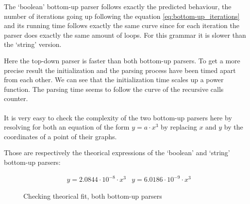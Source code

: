 The `boolean' bottom-up parser follows exactly the predicted behaviour, the number of iterations going up following the equation \ref{eq:bottom-up_iterations} and its running time follows exactly the same curve since for each iteration the parser does exactly the same amount of loops.
For this grammar it is slower than the `string' version.

Here the top-down parser is faster than both bottom-up parsers.
To get a more precise result the initialization and the parsing process have been timed apart from each other.
We can see that the initialization time scales up a power function.
The parsing time seems to follow the curve of the recursive calls counter.
\\
\\
It is very easy to check the complexity of the two bottom-up parsers here by resolving for both an equation of the form $y = a \cdot x^3$ by replacing $x$ and $y$ by the coordinates of a point of their graphs.

Those are respectively the theorical expressions of the `boolean' and `string' bottom-up parsers:

\begin{align*}
    &y = 2.0844 \cdot 10^{-8} \cdot x^3 &y = 6.0186 \cdot 10^{-9} \cdot x^3
\end{align*}

\FloatBarrier
\begin{figure}[h]
\caption{Checking theorical fit, both bottom-up parsers}
\end{figure}
\FloatBarrier

